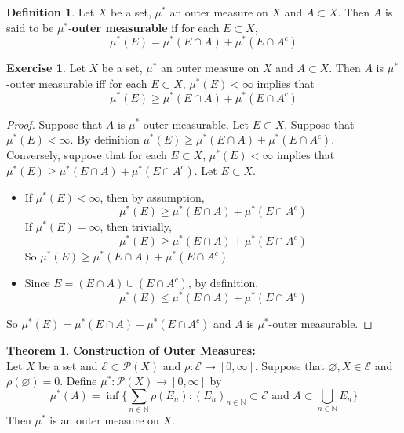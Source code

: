 \documentclass{book}
\theoremstyle{definition}
\newtheorem{defn}[definition]{Definition}
\newtheorem{thm}[definition]{Theorem}
\newtheorem{ex}[definition]{Exercise}
\newcommand{\N}{\mathbb{N}}
\newcommand{\ME}{\mathcal{E}}
\newcommand{\MP}{\mathcal{P}}
\newcommand{\ld}[1]{\label{defn:#1}}
\DeclareMathOperator*{\0}{\mbf{0}}
\DeclareMathOperator*{\1}{\mbf{1}}
\begin{document}
		\begin{defn} \ld{00000} 
		Let $X$ be a set, $\mu^*$ an outer measure on $X$ and $A \subset X$. Then $A$ is said to be $\mu^*$-\textbf{outer measurable} if for each $E \subset X$, 
	\begin{equation*}
	\mu^*(E) = \mu^*(E \cap A) + \mu^*(E \cap A^c)
	\end{equation*}
	\end{defn}
	
	\begin{ex}
	Let $X$ be a set, $\mu^*$ an outer measure on $X$ and $A \subset X$. Then $A$ is $\mu^*$-outer measurable iff for each $E \subset X$, $\mu^*(E) < \infty$ implies that 
	\begin{equation*}
	\mu^*(E) \geq \mu^*(E \cap A) + \mu^*(E \cap A^c)
	\end{equation*}
	\end{ex}	
	
	\begin{proof}
	Suppose that $A$ is $\mu^*$-outer measurable. Let $E \subset X$, Suppose that $\mu^*(E) < \infty$. By definition $\mu^*(E) \geq \mu^*(E \cap A) + \mu^*(E \cap A^c)$. \\
	Conversely, suppose that for each $E \subset X$, $\mu^*(E) < \infty$ implies that $\mu^*(E) \geq \mu^*(E \cap A) + \mu^*(E \cap A^c)$. Let $E \subset X$. 
	\begin{itemize}
	\item If $\mu^*(E) < \infty$, then by assumption, 
	\begin{equation*}
	\mu^*(E) \geq \mu^*(E \cap A) + \mu^*(E \cap A^c)
	\end{equation*}		
	If $\mu^*(E) = \infty$, then trivially, 
	\begin{equation*}
	\mu^*(E) \geq \mu^*(E \cap A) + \mu^*(E \cap A^c)
	\end{equation*}	 
	So $\mu^*(E) \geq \mu^*(E \cap A) + \mu^*(E \cap A^c)$
	\item Since $E = (E \cap A) \cup (E \cap A^c)$, by definition, 
	\begin{equation*}
	\mu^*(E) \leq \mu^*(E \cap A) + \mu^*(E \cap A^c)
	\end{equation*}	
	\end{itemize}
	So $\mu^*(E) = \mu^*(E \cap A) + \mu^*(E \cap A^c)$ and $A$ is $\mu^*$-outer measurable.
	\end{proof}
	
	\begin{thm}\textbf{Construction of Outer Measures:} \\
		Let $X$ be a set and $\ME \subset \MP(X)$ and $\rho: \ME \rightarrow [0, \infty]$. Suppose that $\varnothing, X \in \ME$ and $\rho(\varnothing) = 0$. Define $\mu^*:\MP(X) \rightarrow [0, \infty]$ by $$\mu^*(A) = \inf \bigg \{\sum_{n \in \N}\rho(E_n): (E_n)_{n \in \N} \subset \ME \text{ and }A \subset \bigcup_{n \in \N}E_n \bigg \}$$ Then $\mu^*$ is an outer measure on $X$.
	\end{thm}
	
\end{document}
